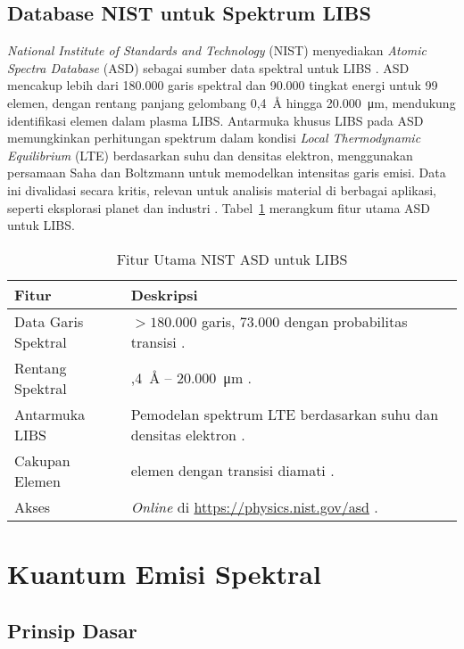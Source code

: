\subsection{Database NIST untuk Spektrum LIBS}
\label{subsec:nist_database}

\textit{National Institute of Standards and Technology} (NIST) menyediakan \textit{Atomic Spectra Database} (ASD) sebagai sumber data spektral untuk LIBS \citep{Kramida2023}. ASD mencakup lebih dari 180.000 garis spektral dan 90.000 tingkat energi untuk 99 elemen, dengan rentang panjang gelombang 0,4~\AA{} hingga 20.000~\si{\micro\meter}, mendukung identifikasi elemen dalam plasma LIBS. Antarmuka khusus LIBS pada ASD memungkinkan perhitungan spektrum dalam kondisi \textit{Local Thermodynamic Equilibrium} (LTE) berdasarkan suhu dan densitas elektron, menggunakan persamaan Saha dan Boltzmann untuk memodelkan intensitas garis emisi. Data ini divalidasi secara kritis, relevan untuk analisis material di berbagai aplikasi, seperti eksplorasi planet dan industri \citep{Kramida2022}. Tabel~\ref{tab:nist_features} merangkum fitur utama ASD untuk LIBS.

\begin{table}[H]
\centering
\caption{Fitur Utama NIST ASD untuk LIBS}
\label{tab:nist_features}
\begin{tabularx}{\textwidth}{>{\raggedright\arraybackslash}X>{\raggedright\arraybackslash}X}
\toprule
\textbf{Fitur} & \textbf{Deskripsi} \\
\midrule
Data Garis Spektral & $>180.000$ garis, 73.000 dengan probabilitas transisi \citep{Kramida2023}. \\
Rentang Spektral & 0,4~\AA{} -- 20.000~\si{\micro\meter} \citep{Kramida2023}. \\
Antarmuka LIBS & Pemodelan spektrum LTE berdasarkan suhu dan densitas elektron \citep{Kramida2023}. \\
Cakupan Elemen & 99 elemen dengan transisi diamati \citep{Kramida2023}. \\
Akses & \textit{Online} di \url{https://physics.nist.gov/asd} \citep{Kramida2023}. \\
\bottomrule
\end{tabularx}
\end{table}
\section{Kuantum Emisi Spektral}
\subsection{Prinsip Dasar}


